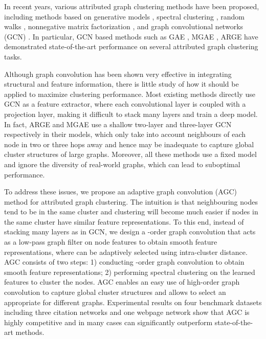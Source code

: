 \documentclass{article}
\begin{document}
In recent years, various attributed graph clustering methods have been proposed, including methods based on generative models \cite{chang2009relational}, spectral clustering \cite{xia2014robust}, random walks \cite{yang2015network}, nonnegative matrix factorization \cite{wang2016semantic}, and graph convolutional networks (GCN) \cite{kipf2016semi}. In particular, GCN based methods such as GAE \cite{kipf2016variational}, MGAE \cite{wang2017mgae}, ARGE \cite{pan2018adversarially} have demonstrated state-of-the-art performance on several attributed graph clustering tasks.

Although graph convolution has been shown very effective in integrating structural and feature information, there is little study of how it should be applied to maximize clustering performance. Most existing methods directly use GCN as a feature extractor, where each convolutional layer is coupled with a projection layer, making it difficult to stack many layers and train a deep model. In fact, ARGE \cite{pan2018adversarially} and MGAE \cite{wang2017mgae} use a shallow two-layer and three-layer GCN respectively in their models, which only take into account neighbours of each node in two or three hops away and hence may be inadequate to capture global cluster structures of large graphs. Moreover, all these methods use a fixed model and ignore the diversity of real-world graphs, which can lead to suboptimal performance.



To address these issues, we propose an adaptive graph convolution (AGC) method for attributed graph clustering. The intuition is that neighbouring nodes tend to be in the same cluster and clustering will become much easier if nodes in the same cluster have similar feature representations. To this end, instead of stacking many layers as in GCN, we design a -order graph convolution that acts as a low-pass graph filter on node features to obtain smooth feature representations, where  can be adaptively selected using intra-cluster distance. AGC consists of two steps: 1) conducting -order graph convolution to obtain smooth feature representations; 2) performing spectral clustering on the learned features to cluster the nodes. AGC enables an easy use of high-order graph convolution to capture global cluster structures and allows to select an appropriate  for different graphs.
Experimental results on four benchmark datasets including three citation networks and one webpage network show that AGC is highly competitive and in many cases can significantly outperform state-of-the-art methods.
\end{document}
